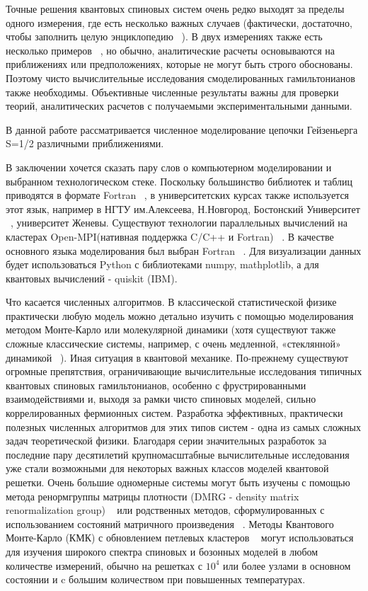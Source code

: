 \documentclass[11pt]{article}
\begin{document}
Точные решения квантовых спиновых систем очень редко выходят за пределы одного измерения, где есть несколько важных случаев (фактически, достаточно, чтобы заполнить целую энциклопедию ~\cite{ws_1994}). В двух измерениях также есть несколько примеров ~\cite{cmp_115_477,prb_80_024422}, но обычно, аналитические расчеты основываются на приближениях или предположениях, которые не могут быть строго обоснованы. Поэтому чисто вычислительные исследования смоделированных гамильтонианов также необходимы. Объективные численные результаты важны для проверки теорий, аналитических расчетов с получаемыми экспериментальными данными.

В данной работе рассматривается численное моделирование цепочки Гейзеньерга S=1/2 различными приближениями.
 
В заключении хочется сказать пару слов о компьютерном моделировании и выбранном технологическом стеке. Поскольку большинство библиотек и таблиц приводятся в формате Fortran ~\cite{pdg}, в университетских курсах также используется этот язык, например в НГТУ им.Алексеева, Н.Новгород, Бостонский Университет ~\cite{py_502}, университет Женевы. Существуют технологии параллельных вычислений на кластерах Open-MPI(нативная поддержка C/C++ и Fortran) ~\cite{intel_mpi}. В качестве основного языка моделирования был выбран Fortran ~\cite{py_502_f}. Для визуализации данных будет использоваться Python с библиотеками numpy, mathplotlib, а для квантовых вычислений - quiskit (IBM).

Что касается численных алгоритмов. В классической статистической физике практически любую модель можно детально изучить с помощью моделирования методом Монте-Карло или молекулярной динамики (хотя существуют также сложные классические системы, например, с очень медленной, «стеклянной» динамикой ~\cite{prb_80_024422}). Иная ситуация в квантовой механике. По-прежнему существуют огромные препятствия, ограничивающие вычислительные исследования типичных квантовых спиновых гамильтонианов, особенно с фрустрированными взаимодействиями и, выходя за рамки чисто спиновых моделей, сильно коррелированных фермионных систем. Разработка эффективных, практически полезных численных алгоритмов для этих типов систем - одна из самых сложных задач теоретической физики. Благодаря серии значительных разработок за последние пару десятилетий крупномасштабные вычислительные исследования уже стали возможными для некоторых важных классов моделей квантовой решетки. Очень большие одномерные системы могут быть изучены с помощью метода ренормгруппы матрицы плотности (DMRG - density matrix renormalization group) ~\cite{prl_69_2863, rmp_77_259} или родственных методов, сформулированных с использованием состояний матричного произведения ~\cite{nature_465, arXiv_0804_2509}. Методы Квантового Монте-Карло (КМК) с обновлением петлевых кластеров ~\cite{ap_52_1, tf_114_570, pre_66_046701} могут использоваться для изучения широкого спектра спиновых и бозонных моделей в любом количестве измерений, обычно на решетках с $10^4$ или более узлами в основном состоянии и c большим количеством при повышенных температурах.
\end{document}
